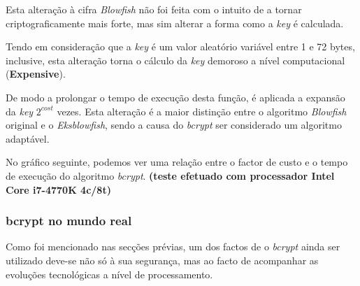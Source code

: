 Esta alteração à cifra \emph{Blowfish} não foi feita com o intuito de a tornar criptograficamente mais forte, mas sim alterar a forma como a \emph{key} é calculada.

Tendo em consideração que a \emph{key} é um valor aleatório variável entre 1 e 72 bytes, inclusive, esta alteração torna o cálculo da \emph{key} demoroso a nível computacional (\textbf{Expensive}).

De modo a prolongar o tempo de execução desta função, é aplicada a expansão da \emph{key} $2^{cost}$ vezes. Esta alteração é a maior distinção entre o algoritmo \emph{Blowfish} original e o \emph{Eksblowfish}, sendo a causa do \emph{bcrypt} ser considerado um algoritmo adaptável.

No gráfico seguinte, podemos ver uma relação entre o factor de custo e o tempo de execução do algoritmo \emph{bcrypt}. \textbf{(teste efetuado com processador Intel Core i7-4770K 4c/8t)}

\begin{center}
\end{center}

\cleardoublepage
\subsubsection{bcrypt no mundo real}

Como foi mencionado nas secções prévias, um dos factos de o \emph{bcrypt} ainda ser utilizado deve-se não só à sua segurança, mas ao facto de acompanhar as evoluções tecnológicas a nível de processamento.

